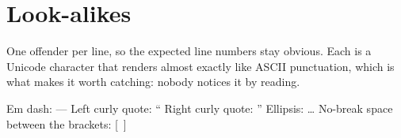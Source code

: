 \section{Look-alikes}
\label{sec:ch01-lookalikes}

One offender per line, so the expected line numbers stay obvious. Each is a
Unicode character that renders almost exactly like ASCII punctuation, which is
what makes it worth catching: nobody notices it by reading.

Em dash: —
Left curly quote: “
Right curly quote: ”
Ellipsis: …
No-break space between the brackets: [ ]
